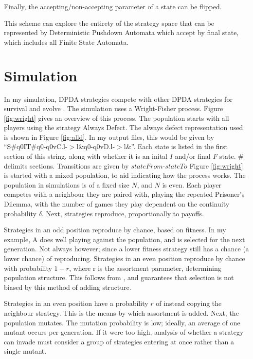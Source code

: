 \documentclass[a4paper,11pt,bcshonoursthesis,singlespace,oneside,thesisdraft,pdflatex]{cssethesis}
\begin{document}
Finally, the accepting/non-accepting parameter of a state can be flipped.

This scheme can explore the entirety of the strategy space that can be represented by Deterministic Pushdown Automata which accept by final state, which includes all Finite State Automata.
\section{Simulation}
In my simulation, DPDA strategies compete with other DPDA strategies for survival and evolve \citep{fogel2006evolutionary}. 
The simulation uses a Wright-Fisher process. Figure \ref{fig:wright} gives an overview of this process. 
The population starts with all players using the strategy Always Defect. The always defect representation used is shown in Figure \ref{fig:alld}. In my output files, this would be given by ``S\#q0IT\#q0-q0vC.l-$>$l\&q0-q0vD.l-$>$l\&''. 
Each state is listed in the first section of this string, along with whether it is an inital $I$ and/or final $F$ state. $\#$ delimits sections. Transitions are given by {$stateFrom$-$stateTo$ }
Figure \ref{fig:wright} is started with a mixed population, to aid indicating how the process works. 
The population in simulations is of a fixed size $N$, and $N$ is even. 
Each player competes with a neighbour they are paired with, playing the repeated Prisoner's Dilemma, with the number of games they play dependent on the continuity probability $\delta$. 
Next, strategies reproduce, proportionally to payoffs. 

Strategies in an odd position reproduce by chance, based on fitness. 
In my example, A does well playing against the population, and is selected for the next generation. 
Not always however; since a lower fitness strategy still has a chance (a lower chance) of reproducing. 
Strategies in an even position reproduce by chance with probability $1-r$, where r is the assortment parameter, determining population structure.  This follows from \citet{van-veelen:PNAS:2012}, and guarantees that selection is not biased by this method of adding structure. 

Strategies in an even position have a probability $r$ of instead copying the neighbour strategy. 
This is the means by which assortment is added. 
Next, the population mutates. 
The mutation probability is low; ideally, an average of one mutant occurs per generation. 
If it were too high, analysis of whether a strategy can invade must consider a group of strategies entering at once rather than a single mutant. 
\end{document}
